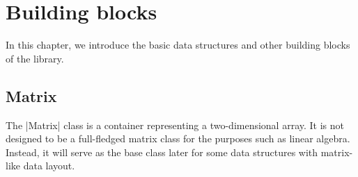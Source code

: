 %
%
%
%

\chapter{Building blocks}
\label{chap:Building blocks}

In this chapter, we introduce the basic data structures and other building
blocks of the library.

\section{Matrix}
\label{sec:Matrix}

The |Matrix| class is a container representing a two-dimensional array. It is
not designed to be a full-fledged matrix class for the purposes such as linear
algebra. Instead, it will serve as the base class later for some data
structures with matrix-like data layout.

